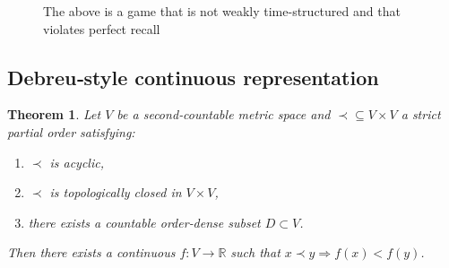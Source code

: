 \documentclass[11pt]{article}
\newtheorem{theorem}[definition]{Theorem}
\begin{document}
\begin{figure}[htbp]
\caption{The above is a game that is not weakly time-structured and that violates perfect recall}
  \label{fig:trees}
\end{figure}


\subsection*{Debreu‑style continuous representation}
\begin{theorem}
Let $V$ be a second‑countable metric space and $\prec\subseteq V\times V$
a strict partial order satisfying:
\begin{enumerate}
  \item $\prec$ is acyclic,
  \item $\prec$ is topologically closed in $V\times V$,
  \item there exists a countable order‑dense subset $D\subset V$.
\end{enumerate}
Then there exists a continuous $f:V\to\mathbb R$ such that
$x\prec y\Rightarrow f(x)<f(y)$.
\end{theorem}
\end{document}
